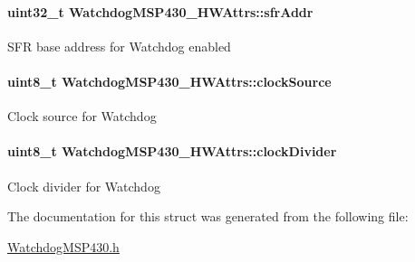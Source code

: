 \paragraph[{sfr\-Addr}]{\setlength{\rightskip}{0pt plus 5cm}uint32\-\_\-t Watchdog\-M\-S\-P430\-\_\-\-H\-W\-Attrs\-::sfr\-Addr}\label{struct_watchdog_m_s_p430___h_w_attrs_a763f95534b160827a7c199ddab02a6b9}
S\-F\-R base address for Watchdog enabled 
\paragraph[{clock\-Source}]{\setlength{\rightskip}{0pt plus 5cm}uint8\-\_\-t Watchdog\-M\-S\-P430\-\_\-\-H\-W\-Attrs\-::clock\-Source}\label{struct_watchdog_m_s_p430___h_w_attrs_a7b0d9bd3ef04e58530c19312621b05a2}
Clock source for Watchdog 
\paragraph[{clock\-Divider}]{\setlength{\rightskip}{0pt plus 5cm}uint8\-\_\-t Watchdog\-M\-S\-P430\-\_\-\-H\-W\-Attrs\-::clock\-Divider}\label{struct_watchdog_m_s_p430___h_w_attrs_a405ce3d2556166a841de62f207ce8675}
Clock divider for Watchdog 

The documentation for this struct was generated from the following file\-:\begin{DoxyCompactItemize}
\item 
\hyperlink{_watchdog_m_s_p430_8h}{Watchdog\-M\-S\-P430.\-h}\end{DoxyCompactItemize}
